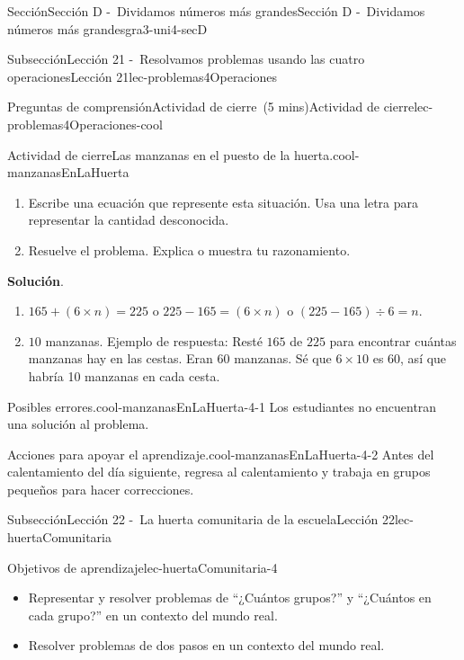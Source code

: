 \documentclass[oneside,10pt,]{article}
\newcommand{\blocktitlefont}{\relax}
\begin{document}
\begin{sectionptx}{Sección}{Sección D -~Dividamos números más grandes}{}{Sección D -~Dividamos números más grandes}{}{}{gra3-uni4-secD}
\begin{subsectionptx}{Subsección}{Lección 21 -~Resolvamos problemas usando las cuatro operaciones}{}{Lección 21}{}{}{lec-problemas4Operaciones}
\begin{reading-questions-subsubsection}{Preguntas de comprensión}{Actividad de cierre~(5 mins)}{}{Actividad de cierre}{}{}{lec-problemas4Operaciones-cool}
\begin{project}{Actividad de cierre}{Las manzanas en el puesto de la huerta.}{cool-manzanasEnLaHuerta}
%
\begin{enumerate}[label={(\alph*)}]
\item{}Escribe una ecuación que represente esta situación. Usa una letra para representar la cantidad desconocida.%
\item{}Resuelve el problema. Explica o muestra tu razonamiento.%
\end{enumerate}
\par\smallskip%
\noindent\textbf{\blocktitlefont Solución}.\hypertarget{cool-manzanasEnLaHuerta-3}{}\quad{}%
\begin{enumerate}[label={(\alph*)}]
\item{}\(165 + (6 \times n) = 225\) o \(225 - 165 = (6 \times n)\) o \((225 - 165) \div 6 = n\).%
\item{}\(10\) manzanas. Ejemplo de respuesta: Resté \(165\) de \(225\) para encontrar cuántas manzanas hay en las cestas. Eran \(60\) manzanas. Sé que \(6 \times 10\) es \(60\), así que habría 10 manzanas en cada cesta.%
\end{enumerate}
\end{project}%
\par
\begin{paragraphs}{Posibles errores.}{cool-manzanasEnLaHuerta-4-1}%
Los estudiantes no encuentran una solución al problema.%
\end{paragraphs}%
\begin{paragraphs}{Acciones para apoyar el aprendizaje.}{cool-manzanasEnLaHuerta-4-2}%
Antes del calentamiento del día siguiente, regresa al calentamiento y trabaja en grupos pequeños para hacer correcciones.%
\end{paragraphs}%
\end{reading-questions-subsubsection}
\end{subsectionptx}
%
%
\typeout{************************************************}
\typeout{************************************************}
%
\begin{subsectionptx}{Subsección}{Lección 22 -~La huerta comunitaria de la escuela}{}{Lección 22}{}{}{lec-huertaComunitaria}
\begin{objectives}{Objetivos de aprendizaje}{lec-huertaComunitaria-4}
%
\begin{itemize}[label=\textbullet]
\item{}Representar y resolver problemas de ``¿Cuántos grupos?'' y ``¿Cuántos en cada grupo?'' en un contexto del mundo real.%
\item{}Resolver problemas de dos pasos en un contexto del mundo real.%

\end{itemize}
\end{objectives}
\end{subsectionptx}
\end{sectionptx}
\end{document}
